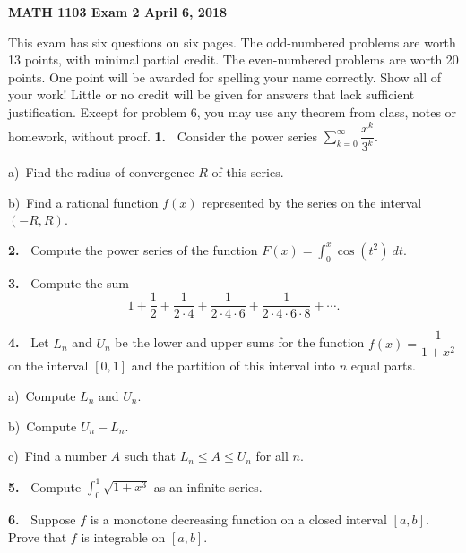 \documentclass[10pt]{article}
\theoremstyle{definition}
\theoremstyle{remark}
\theoremstyle{definition}
\begin{document}
  

{\bf MATH 1103 Exam 2  April 6, 2018}
\qquad\qquad\qquad\qquad{}

\vskip10pt
This exam has six questions on six pages. The odd-numbered problems are worth 13 points, with minimal partial credit. The even-numbered problems are worth 20 points. One point will be awarded for spelling your name correctly. Show all of your work! Little or no credit will be given for answers that lack sufficient justification. Except for problem 6, you may use any theorem from class, notes or homework, without proof. 
\vskip5pt
{\bf 1.\ } Consider the power series $\sum\limits_{k=0}^\infty\dfrac{x^k}{3^k}$. 

a)\ Find the radius of convergence $R$ of this series. 

b)\ Find a rational function $f(x)$ represented by the series on the interval $(-R,R)$. 

\newpage

{\bf 2.\ } Compute the power series of the function $F(x)=\displaystyle{\int_0^x\cos(t^2)\ dt}$.

\newpage

{\bf 3.\ } Compute the sum 
\[1+\frac{1}{2}+\frac{1}{2\cdot 4}+\frac{1}{2\cdot 4\cdot 6}+\frac{1}{2\cdot 4\cdot 6\cdot 8}+\cdots.\]



\newpage
{\bf 4.\ } Let $L_n$ and $U_n$ be the lower and upper sums for the function $f(x)=\dfrac{1}{1+x^2}$ on the interval $[0,1]$ and the partition of this interval into $n$ equal parts. 

a)\ Compute $L_n$ and $U_n$. 

b)\ Compute $U_n-L_n$. 

c)\ Find a number $A$ such that $L_n\leq A\leq U_n$ for all $n$. 
\newpage


{\bf 5.\ } Compute  $\displaystyle{\int_0^1\sqrt{1+x^3}}$ as an infinite series. 

\newpage
{\bf 6.\ } Suppose $f$ is a monotone decreasing function on a closed interval $[a,b]$.  Prove that $f$ is integrable on $[a,b]$. 
\end{document}
